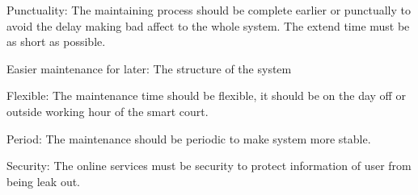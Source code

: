 \item Punctuality: The maintaining process should be complete earlier or punctually to avoid the delay making bad affect to the whole system. The extend time must be as short as possible.
\item Easier maintenance for later: The structure of the system
\item Flexible: The maintenance time should be flexible, it should be on the day off or outside working hour of the smart court.
\item Period: The maintenance should be periodic to make system more stable.
\item  Security:  The online  services  must  be  security  to  protect  information  of  user from being leak out.
